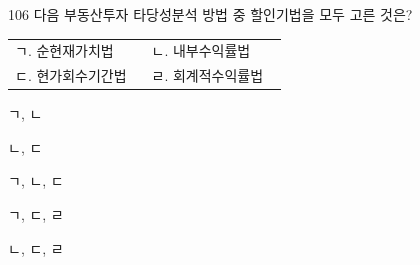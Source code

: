 \begin{question}{106}
다음 부동산투자 타당성분석 방법 중 할인기법을 모두 고른 것은?
\begin{framedtext}
\begin{tabular}{@{}p{0.46\linewidth}p{0.46\linewidth}@{}}
ㄱ. 순현재가치법 & ㄴ. 내부수익률법 \\
ㄷ. 현가회수기간법 & ㄹ. 회계적수익률법 \\
\end{tabular}
\end{framedtext}
\begin{choices}
  \item ㄱ, ㄴ
  \item ㄴ, ㄷ
  \item ㄱ, ㄴ, ㄷ
  \item ㄱ, ㄷ, ㄹ
  \item ㄴ, ㄷ, ㄹ
\end{choices}
\end{question}
